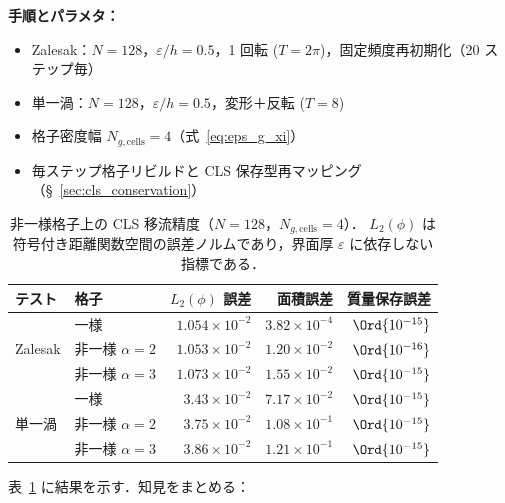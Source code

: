 \noindent\textbf{手順とパラメタ：}
\begin{itemize}[noitemsep]
  \item Zalesak：$N = 128$，$\varepsilon/h = 0.5$，1 回転 ($T = 2\pi$)，固定頻度再初期化（20 ステップ毎）
  \item 単一渦：$N = 128$，$\varepsilon/h = 0.5$，変形＋反転 ($T = 8$)
  \item 格子密度幅 $N_{g,\text{cells}} = 4$（式~\eqref{eq:eps_g_xi}）
  \item 毎ステップ格子リビルドと CLS 保存型再マッピング（§~\ref{sec:cls_conservation}）
\end{itemize}

\begin{table}[htbp]
\centering
\caption{非一様格子上の CLS 移流精度（$N = 128$，$N_{g,\text{cells}} = 4$）．
$L_2(\phi)$ は符号付き距離関数空間の誤差ノルムであり，界面厚 $\varepsilon$ に依存しない指標である．}
\label{tab:cls_nonuniform}
\renewcommand{\arraystretch}{1.3}
\begin{tabular}{llrrr}
\toprule
テスト & 格子 & $L_2(\phi)$ 誤差 & 面積誤差 & 質量保存誤差 \\
\midrule
\multirow{3}{*}{Zalesak}
  & 一様              & $1.054 \times 10^{-2}$ & $3.82 \times 10^{-4}$ & $\Ord{10^{-15}}$ \\
  & 非一様 $\alpha=2$ & $1.053 \times 10^{-2}$ & $1.20 \times 10^{-2}$ & $\Ord{10^{-16}}$ \\
  & 非一様 $\alpha=3$ & $1.073 \times 10^{-2}$ & $1.55 \times 10^{-2}$ & $\Ord{10^{-15}}$ \\
\midrule
\multirow{3}{*}{単一渦}
  & 一様              & $3.43 \times 10^{-2}$ & $7.17 \times 10^{-2}$ & $\Ord{10^{-15}}$ \\
  & 非一様 $\alpha=2$ & $3.75 \times 10^{-2}$ & $1.08 \times 10^{-1}$ & $\Ord{10^{-15}}$ \\
  & 非一様 $\alpha=3$ & $3.86 \times 10^{-2}$ & $1.21 \times 10^{-1}$ & $\Ord{10^{-15}}$ \\
\bottomrule
\end{tabular}
\end{table}

表~\ref{tab:cls_nonuniform} に結果を示す．知見をまとめる：

